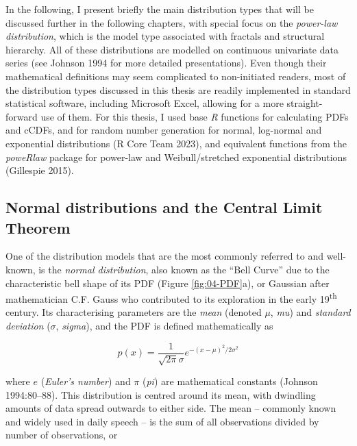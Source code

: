 \documentclass[
  12pt,
]{book}
\begin{document}
In the following, I present briefly the main distribution types that will be discussed further in the following chapters, with special focus on the \emph{power-law distribution}, which is the model type associated with fractals and structural hierarchy. All of these distributions are modelled on continuous univariate data series (see Johnson 1994 for more detailed presentations). Even though their mathematical definitions may seem complicated to non-initiated readers, most of the distribution types discussed in this thesis are readily implemented in standard statistical software, including Microsoft Excel, allowing for a more straight-forward use of them. For this thesis, I used base \emph{R} functions for calculating PDFs and cCDFs, and for random number generation for normal, log-normal and exponential distributions (R Core Team 2023), and equivalent functions from the \emph{poweRlaw} package for power-law and Weibull/stretched exponential distributions (Gillespie 2015).

\FloatBarrier

\hypertarget{normal-distributions-and-the-central-limit-theorem}{%
\subsection{Normal distributions and the Central Limit Theorem}\label{normal-distributions-and-the-central-limit-theorem}}

One of the distribution models that are the most commonly referred to and well-known, is the \emph{normal distribution}, also known as the ``Bell Curve'' due to the characteristic bell shape of its PDF (Figure \ref{fig:04-PDF}a), or Gaussian after mathematician C.F. Gauss who contributed to its exploration in the early 19\textsuperscript{th} century. Its characterising parameters are the \emph{mean} (denoted \(\mu\), \emph{mu}) and \emph{standard deviation} (\(\sigma\), \emph{sigma}), and the PDF is defined mathematically as

\begin{equation}
p(x)=\frac{1}{\sqrt{2\pi}\sigma}e^{-(x-\mu)^2/2\sigma^2}
\label{eq:normal}
\end{equation}

where \(e\) (\emph{Euler's number}) and \(\pi\) (\emph{pi}) are mathematical constants (Johnson 1994:80--88). This distribution is centred around its mean, with dwindling amounts of data spread outwards to either side. The mean -- commonly known and widely used in daily speech -- is the sum of all observations divided by number of observations, or
\end{document}

